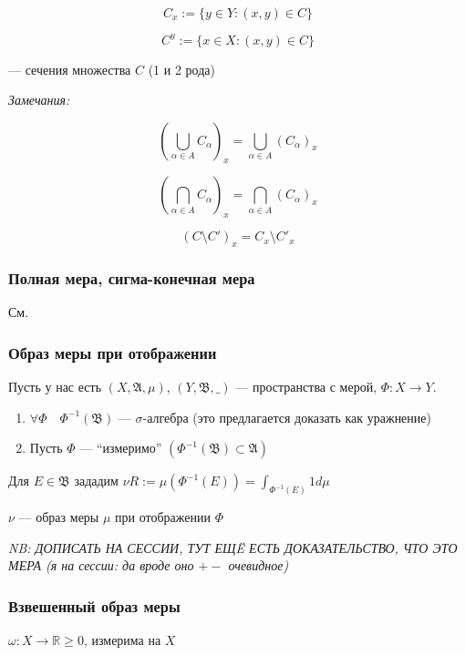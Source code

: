 \documentclass{article}
\begin{document}
\[C_{x} := \{y \in Y: (x, y) \in C\}\]

\[C^{y} := \{x \in X: (x, y) \in C\}\]

--- сечения множества $C$ (1 и 2 рода)

\textit{Замечания: }

\[\left(\bigcup_{\alpha \in A} C_{\alpha}\right)_{x} = \bigcup_{\alpha \in A} \left(C_{\alpha}\right)_{x}\]

\[\left(\bigcap_{\alpha \in A} C_{\alpha}\right)_{x} = \bigcap_{\alpha \in A} \left(C_{\alpha}\right)_{x}\]

\[\left(C \setminus C'\right)_{x} = C_{x} \setminus C'_{x}\]

\subsubsection{Полная мера, сигма-конечная мера}

См. \href{http://gg.gg/holykpksem3}{\color{blue}{конспект прошлого семестра}}

\subsubsection{Образ меры при отображении}

Пусть у нас есть $(X, \mathfrak{A}, \mu)$, $(Y, \mathfrak{B}, \_ )$ --- пространства с мерой, $\Phi: X \rightarrow Y$.

\begin{enumerate}
    \item $\forall \Phi \quad \Phi^{-1}(\mathfrak{B})$ --- $\sigma$-алгебра (это предлагается доказать как уражнение)
    \item Пусть $\Phi$ --- ``измеримо'' $\left(\Phi^{-1}(\mathfrak{B}) \subset \mathfrak{A}\right)$
\end{enumerate}

Для $E \in \mathfrak{B}$ зададим $\nu R := \mu\left(\Phi^{-1}(E)\right) = \int_{\Phi^{-1}(E)} 1 d \mu$

$\nu$ --- образ меры $\mu$ при отображении $\Phi$

\textit{NB: ДОПИСАТЬ НА СЕССИИ, ТУТ ЕЩË ЕСТЬ ДОКАЗАТЕЛЬСТВО, ЧТО ЭТО МЕРА (я на сессии: да вроде оно $+-$ очевидное)}

\subsubsection{Взвешенный образ меры}

$\omega: X \rightarrow \mathbb{R} \ge 0$, измерима на $X$
\end{document}
